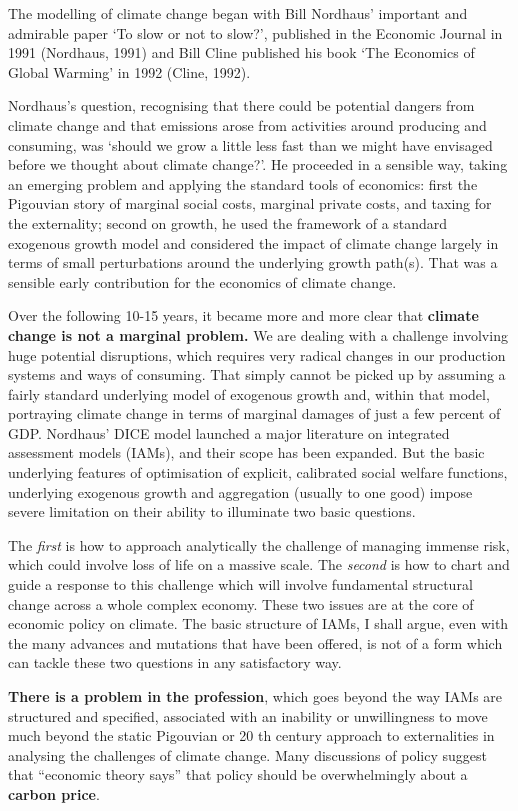 \documentclass[
]{book}
\begin{document}
The modelling of climate change
began with Bill Nordhaus' important and admirable paper `To slow or not to slow?', published in the
Economic Journal in 1991 (Nordhaus, 1991) and Bill Cline published his book `The Economics of Global Warming' in 1992 (Cline, 1992).

Nordhaus's question, recognising that there could be potential dangers
from climate change and that emissions arose from activities around producing and consuming, was
`should we grow a little less fast than we might have envisaged before we thought about climate
change?'. He proceeded in a sensible way, taking an emerging problem and applying the standard tools
of economics: first the Pigouvian story of marginal social costs, marginal private costs, and taxing for
the externality; second on growth, he used the framework of a standard exogenous growth model and
considered the impact of climate change largely in terms of small perturbations around the underlying
growth path(s). That was a sensible early contribution for the economics of climate change.

Over the following 10-15 years, it became more and more clear that
\textbf{climate change is not a marginal problem.}
We are dealing with a challenge involving huge potential disruptions, which requires very
radical changes in our production systems and ways of consuming. That simply cannot be picked up
by assuming a fairly standard underlying model of exogenous growth and, within that model, portraying
climate change in terms of marginal damages of just a few percent of GDP. Nordhaus' DICE model
launched a major literature on integrated assessment models (IAMs), and their scope has been
expanded. But the basic underlying features of optimisation of explicit, calibrated social welfare
functions, underlying exogenous growth and aggregation (usually to one good) impose severe limitation
on their ability to illuminate two basic questions.

The \emph{first} is how to approach analytically the challenge
of managing immense risk, which could involve loss of life on a massive scale. The \emph{second} is how to
chart and guide a response to this challenge which will involve fundamental structural change across a
whole complex economy. These two issues are at the core of economic policy on climate. The basic
structure of IAMs, I shall argue, even with the many advances and mutations that have been offered, is
not of a form which can tackle these two questions in any satisfactory way.

\textbf{There is a problem in the profession}, which goes beyond the way IAMs are structured and specified,
associated with an inability or unwillingness to move much beyond the static Pigouvian or 20 th century
approach to externalities in analysing the challenges of climate change.
Many discussions of policy suggest that ``economic theory says'' that
policy should be overwhelmingly about a \textbf{carbon price}.
\end{document}

